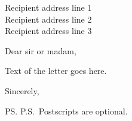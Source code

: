 \documentclass[11pt,twoside]{letter}
\date{February 29, 1999}
\begin{document}
\begin{letter}{
    Recipient address line 1\\
    Recipient address line 2\\
    Recipient address line 3
  }

  \opening{Dear sir or madam,}

  Text of the letter goes here.

  \closing{Sincerely,}

  \ps{P.S.~Postscripts are optional.}
\end{letter}
\end{document}
